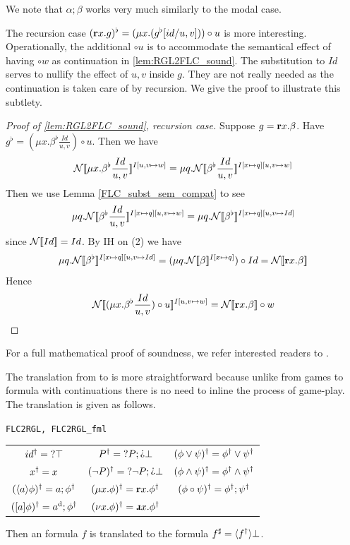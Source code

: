We note that $\alpha ;\beta$ works very much similarly to the modal case. 

The recursion case $(\textbf{r} x. g)^{\flat}=(\mu x.(g^{\flat}[id/u,v]))\circ u$ is more interesting. Operationally, the additional $\circ u$ is to accommodate the semantical effect of having $\circ w$ as continuation in \autoref{lem:RGL2FLC_sound}. The substitution to $Id$ serves to nullify the effect of $u,v$ inside $g$. They are not really needed as the continuation is taken care of by recursion. We give the proof to illustrate this subtlety.

\begin{proof}[Proof of \autoref{lem:RGL2FLC_sound}, recursion case]
    Suppose $g= \textbf{r} x. \beta$. Have $g^\flat = (\mu x. \beta^\flat \frac{Id}{u,v})\circ u$. Then we have 
    \[\mathcal N[\![\mu x. \beta^\flat\frac{Id}{u,v}]\!]^{I[u,v\mapsto w]} = \mu q. \mathcal N[\![ \beta^\flat\frac{Id}{u,v}]\!]^{I[x\mapsto q][u,v \mapsto w]}\]
    Then we use Lemma \autoref{FLC_subst_sem_compat} to see
    \[\mu q. \mathcal N[\![ \beta^\flat\frac{Id}{u,v}]\!]^{I[x\mapsto q][u,v \mapsto w]}= \mu q. \mathcal N[\![ \beta^\flat]\!]^{I[x\mapsto q][u,v\mapsto Id]}\] since $\mathcal N[\![ Id]\!] = Id$. By IH on (2) we have
    \[\mu q. \mathcal N[\![ \beta^\flat]\!]^{I[x\mapsto q][u,v\mapsto Id]} = (\mu q. \mathcal N[\![ \beta]\!]^{I[x\mapsto q]})\circ Id = \mathcal N[\![\textbf{r} x. \beta]\!]\]
    Hence
    \[\mathcal N[\![(\mu x. \beta^\flat\frac{Id}{u,v})\circ u]\!]^{I[u,v\mapsto w]} = \mathcal N[\![ \textbf{r} x.\beta]\!]\circ w \]
\end{proof}

For a full mathematical proof of soundness, we refer interested readers to \cite{Wafa_2024}.

The translation from \FLC{} to \RGL{} is more straightforward because unlike from games to formula with continuations there is no need to inline the process of game-play. The translation is given as follows.

\begin{bdefinition}

\texttt{FLC2RGL, FLC2RGL\_fml}

\begin{tabular}{c c c}
$id^{\dagger}=\text{?}\top$ 
& $P^{\shp}=\Test P;\DTest\bot$ 
& $(\phi\vee\psi)^{\dagger} =\phi^{\dagger}\vee\psi^{\dagger}$ \\
  $x^{\dagger} = x$ & $(\neg P)^\shp = \Test\neg P; \DTest\bot$ & $(\phi\wedge\psi)^\dagger = \phi^\dagger\wedge\psi^\dagger$\\
  $(\langle a\rangle\phi)^\dagger=a;\phi^\dagger$ & $(\mu x. \phi)^\dagger=\textbf{r} x. \phi^\dagger$ & $(\phi\circ\psi)^\dagger=\phi^\dagger;\psi^\dagger$ \\
  $([a]\phi)^\dagger=a^\text{d};\phi^\dagger$ & $(\nu x. \phi)^\shp=\DRec x. \phi^\shp$
\end{tabular}

\medskip

Then an \FLC{} formula $f$ is translated to the \RGL{} formula
$f^{\sharp} = \langle f^{\dagger}\rangle\bot$.
\end{bdefinition}

